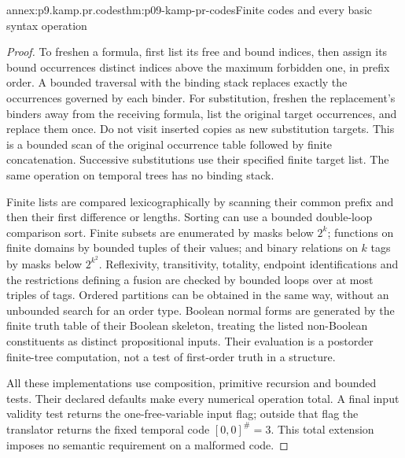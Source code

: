 \begin{annexitem}{annex:p9.kamp.pr.codes}{thm:p09-kamp-pr-codes}{Finite codes and every basic syntax operation}
\begin{proof}
To freshen a formula, first list its free and bound indices, then
assign its bound occurrences distinct indices above the maximum
forbidden one, in prefix order. A bounded traversal with the binding
stack replaces exactly the occurrences governed by each binder.
For substitution, freshen the replacement's binders away from the
receiving formula, list the original target occurrences, and replace
them once. Do not visit inserted copies as new substitution targets.
This is a bounded scan of the original occurrence table followed by
finite concatenation. Successive substitutions use their specified
finite target list. The same operation on temporal trees has no
binding stack.

Finite lists are compared lexicographically by scanning their common
prefix and then their first difference or lengths. Sorting can use
a bounded double-loop comparison sort. Finite subsets are enumerated
by masks below \(2^k\); functions on finite domains by bounded
tuples of their values; and binary relations on \(k\) tags by
masks below \(2^{k^2}\). Reflexivity, transitivity, totality,
endpoint identifications and the restrictions defining a fusion are
checked by bounded loops over at most triples of tags. Ordered
partitions can be obtained in the same way, without an unbounded
search for an order type. Boolean normal forms are generated by
the finite truth table of their Boolean skeleton, treating the
listed non-Boolean constituents as distinct propositional inputs.
Their evaluation is a postorder finite-tree computation, not a
test of first-order truth in a structure.

All these implementations use composition, primitive recursion and
bounded tests. Their declared defaults make every numerical operation
total. A final input validity test returns the one-free-variable input flag;
outside that flag the translator returns the fixed temporal code
\([0,0]^\#=3\). This total extension imposes no semantic
requirement on a malformed code.
\end{proof}
\end{annexitem}

